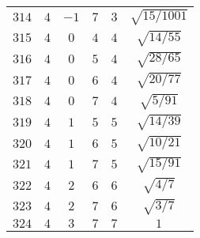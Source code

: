 \begin{table}
\begin{center}
\begin{tabular}{|c|c|c|c|c|c|}
$314$ & $4$ & $-1$ & $7$ & $3$ & $\sqrt{15/1001}$ \\ 
$315$ & $4$ & $0$ & $4$ & $4$ & $\sqrt{14/55}$ \\ 
$316$ & $4$ & $0$ & $5$ & $4$ & $\sqrt{28/65}$ \\ 
$317$ & $4$ & $0$ & $6$ & $4$ & $\sqrt{20/77}$ \\ 
$318$ & $4$ & $0$ & $7$ & $4$ & $\sqrt{5/91}$ \\ 
$319$ & $4$ & $1$ & $5$ & $5$ & $\sqrt{14/39}$ \\ 
$320$ & $4$ & $1$ & $6$ & $5$ & $\sqrt{10/21}$ \\ 
$321$ & $4$ & $1$ & $7$ & $5$ & $\sqrt{15/91}$ \\ 
$322$ & $4$ & $2$ & $6$ & $6$ & $\sqrt{4/7}$ \\ 
$323$ & $4$ & $2$ & $7$ & $6$ & $\sqrt{3/7}$ \\ 
$324$ & $4$ & $3$ & $7$ & $7$ & $1$ \\ 
\hline 
\end{tabular}
\end{center}
\end{table}

